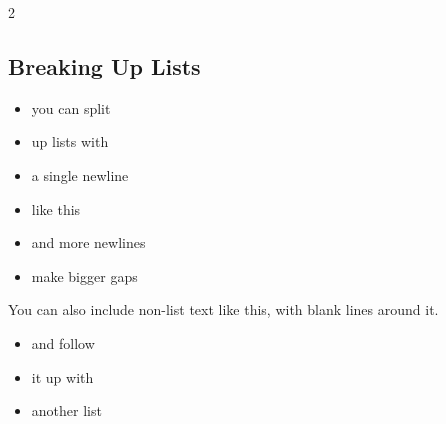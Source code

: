 \documentclass[11pt,letterpaper]{article}
\begin{document}
\begin{multicols*}{2}
\vfill\null\columnbreak

\subsection*{Breaking Up Lists}
\begin{itemize}
    \item you can split
    \item up lists with
\end{itemize}
\vspace{0.1cm}
\begin{itemize}
    \item a single newline
    \item like this
\end{itemize}
\vspace{0.1cm}\vspace{2\baselineskip}
\begin{itemize}
    \item and more newlines
    \item make bigger gaps
\end{itemize}
\vspace{1\baselineskip}

You can also include non-list text like this, with blank lines around it.

\vspace{1\baselineskip}
\begin{itemize}
    \item and follow
    \item it up with
    \item another list
\end{itemize}


\end{multicols*}
\end{document}
